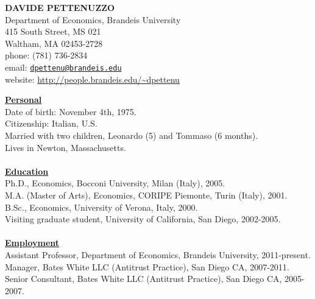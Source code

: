 \documentclass[12pt]{article}
\begin{document}
\begin{center}
\textbf{DAVIDE PETTENUZZO} \\
Department of Economics, Brandeis University \\
415 South Street, MS 021 \\
Waltham, MA 02453-2728 \\
phone: (781) 736-2834 \\
email: \href{mailto:dpettenu@brandeis.edu}{\nolinkurl{dpettenu@brandeis.edu}} \\
website: \url{http://people.brandeis.edu/~dpettenu} \\
\end{center}
\hline 
\bigskip

\underline{\textbf{Personal}}\\
Date of birth: November 4th, 1975. \\
Citizenship: Italian, U.S. \\
Married with two children, Leonardo (5) and Tommaso (6 months). \\
Lives in Newton, Massachusetts. \\ \\ 
\underline{\textbf{Education}}\\
Ph.D., Economics, Bocconi University, Milan (Italy), 2005.\\
M.A. (Master of Arts), Economics, CORIPE Piemonte, Turin (Italy), 2001. \\
B.Sc., Economics, University of Verona, Italy, 2000.\\
Visiting graduate student, University of California, San Diego, 2002-2005. \\ \\
\underline{\textbf{Employment}}\\
Assistant Professor, Department of Economics, Brandeis University, 2011-present.\\
Manager, Bates White LLC (Antitrust Practice), San Diego CA, 2007-2011.\\
Senior Consultant, Bates White LLC (Antitrust Practice), San Diego CA, 2005-2007. \\ \\
\end{document}
